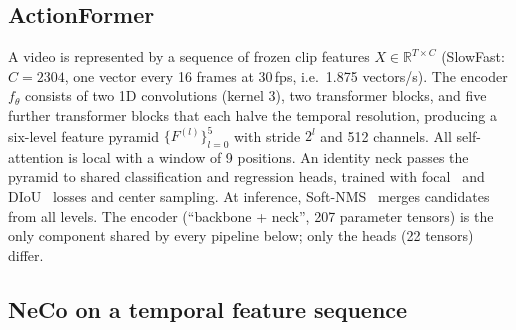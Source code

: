 \documentclass[10pt,a4paper]{article}
\begin{document}
\subsection{ActionFormer}
A video is represented by a sequence of frozen clip features $X\in\mathbb{R}^{T\times C}$
(SlowFast: $C{=}2304$, one vector every 16 frames at 30\,fps, i.e.\ 1.875 vectors/s).
The encoder $f_\theta$ consists of two 1D convolutions (kernel 3), two transformer blocks,
and five further transformer blocks that each halve the temporal resolution, producing a
six-level feature pyramid $\{F^{(l)}\}_{l=0}^{5}$ with stride $2^l$ and 512 channels. All
self-attention is local with a window of 9 positions. An identity neck passes the pyramid to
shared classification and regression heads, trained with focal~\cite{lin2017focal} and
DIoU~\cite{zheng2020diou} losses and center sampling. At inference, Soft-NMS~\cite{bodla2017softnms}
merges candidates from all levels. The encoder (``backbone + neck'', 207 parameter tensors)
is the only component shared by every pipeline below; only the heads (22 tensors)
differ.

\subsection{NeCo on a temporal feature sequence}\label{sec:neco1d}
\end{document}
